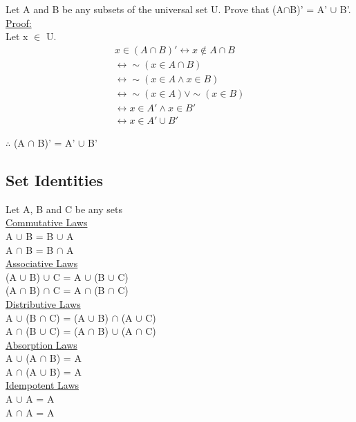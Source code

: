 \documentclass{article}
\begin{document}
Let A and B be any subsets of the universal set U. Prove that (A$\cap$B)' = A' $\cup$ B'. \\

\underline{Proof:} \\

Let x $\in$ U.
\begin{align}
x \in (A \cap B)' \leftrightarrow x \notin A \cap B \\
\leftrightarrow \sim (x \in A \cap B) \\
\leftrightarrow \sim (x \in A \wedge x \in B) \\
\leftrightarrow \sim (x \in A) \lor \sim (x \in B) \\
\leftrightarrow x \in A' \wedge x \in B' \\
\leftrightarrow x \in A' \cup B' 
\end{align}

$\therefore$ (A $\cap$ B)' = A' $\cup$ B' \\

\subsection{Set Identities}
Let A, B and C be any sets \\

\underline{Commutative Laws} \\
A $\cup$ B = B $\cup$ A \\
A $\cap$ B = B $\cap$ A \\

\underline{Associative Laws} \\
(A $\cup$ B) $\cup$ C = A $\cup$ (B $\cup$ C) \\
(A $\cap$ B) $\cap$ C = A $\cap$ (B $\cap$ C) \\

\underline{Distributive Laws} \\ 
A $\cup$ (B $\cap$ C) = (A $\cup$ B) $\cap$ (A $\cup$ C) \\
A $\cap$ (B $\cup$ C) = (A $\cap$ B) $\cup$ (A $\cap$ C) \\

\underline{Absorption Laws} \\
A $\cup$ (A $\cap$ B) = A \\
A $\cap$ (A $\cup$ B) = A \\

\underline{Idempotent Laws} \\
A $\cup$ A = A \\
A $\cap$ A = A \\
\end{document}
